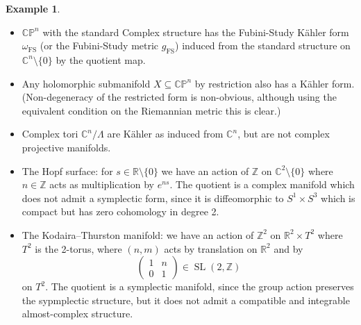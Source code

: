 \documentclass{article}
\theoremstyle{definition}
\newtheorem*{example}{Example}
\DeclareMathOperator{\SL}{SL}
\newcommand{\FS}{\mathrm{FS}}
\newcommand{\CP}{\mathbb{CP}}
\newcommand{\Z}{\mathbb{Z}}
\newcommand{\R}{\mathbb{R}}
\newcommand{\C}{\mathbb{C}}
\begin{document}
\begin{example}
    ~
    \begin{itemize}
        \item $\CP^n$ with the standard Complex structure has the Fubini-Study
            K\"ahler form $\omega_\FS$ (or the Fubini-Study metric $g_\FS$)
            induced from the standard structure on $\C^n\setminus\{0\}$ by the
            quotient map.

        \item Any holomorphic submanifold $X\subseteq\CP^n$ by restriction also
            has a K\"ahler form. (Non-degeneracy of the restricted form is
            non-obvious, although using the equivalent condition on the
            Riemannian metric this is clear.)

        \item Complex tori $\C^n/\Lambda$ are K\"ahler as induced from $\C^n$,
            but are not complex projective manifolds.

        \item The Hopf surface: for $s\in\R\setminus\{0\}$ we have an action of
            $\Z$ on $\C^2\setminus\{0\}$ where $n\in\Z$ acts as multiplication
            by $e^{ns}$. The quotient is a complex manifold which does not admit
            a symplectic form, since it is diffeomorphic to $S^1\times S^3$
            which is compact but has zero cohomology in degree 2.

        \item The Kodaira--Thurston manifold: we have an action of $\Z^2$ on
            $\R^2\times T^2$ where $T^2$ is the 2-torus, where $(n,m)$ acts by
            translation on $\R^2$ and by
            \begin{equation*}
                \begin{pmatrix}
                    1 & n \\ 0 & 1
                \end{pmatrix} \in \SL(2,\Z)
            \end{equation*}
            on $T^2$. The quotient is a symplectic manifold, since the group
            action preserves the sypmplectic structure, but it does not admit a
            compatible and integrable almost-complex structure.


\end{itemize}
\end{example}
\end{document}
